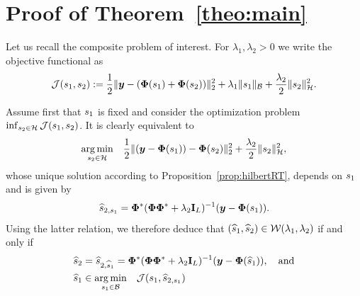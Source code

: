 \clearpage
\appendix

\section{Proof of Theorem~\ref{theo:main}}
\label{app:prooftheo1}

    Let us recall the composite problem of interest. For $\lambda_1, \lambda_2 > 0$ we write the objective functional as
    \begin{equation*}
        \mathcal{J}(s_1, s_2) := \frac{1}{2} \| \bm{y} - (\bm{\Phi} (s_1) + \bm{\Phi} (s_2)) \|_2^2  + \lambda_{1} \| s_1 \|_{\mathcal{B}} + \frac{\lambda_{2}}{2} \| s_2 \|_{\mathcal{H}}^2.
    \end{equation*}
    
    
    Assume first that $s_1$ is fixed and consider the optimization problem $\inf_{s_2 \in \mathcal{H}} \mathcal{J}(s_1, s_2)$. It is clearly equivalent to
    \begin{equation*}
        \underset{s_2 \in \mathcal{H}}{\arg\min}  \quad \frac{1}{2} \| (\bm{y} - \bm{\Phi}(s_1)) - \bm{\Phi}(s_2) \|_2^2 + \frac{\lambda_{2}}{2} \| s_2 \|_{\mathcal{H}}^2,
    \end{equation*}
    whose unique solution according to Proposition~\ref{prop:hilbertRT}, depends on $s_1$ and is given by
    \begin{equation}
        \label{eq:hatfwithfb}
        \widehat{s}_{2, s_1} =\bm{\Phi}^* ( \bm{\Phi} \bm{\Phi}^* + \lambda_{2} \mathbf{I}_L)^{-1} ( \bm{y} - \bm{\Phi}(s_1) ). 
    \end{equation}
    Using the latter relation, we therefore deduce that $(\widehat{s}_1,\widehat{s}_2) \in \mathcal{W} (\lambda_{1},\lambda_{2})$ if and only if  
    \begin{align}
        \widehat{s}_2 &= \widehat{s}_{2,\widehat{s}_1} = \bm{\Phi}^* ( \bm{\Phi} \bm{\Phi}^* + \lambda_{2} \mathbf{I}_L)^{-1} ( \bm{y} - \bm{\Phi}(\widehat{s}_1) ) , \quad \text{and} \label{eq:findmethishfh}\\
        \widehat{s}_1 &\in\underset{s_1 \in \mathcal{B}}{\arg\min}  \quad \mathcal{J}(s_1, \widehat{s}_{2, s_1}) \label{eq:newhproblem}
    \end{align}

